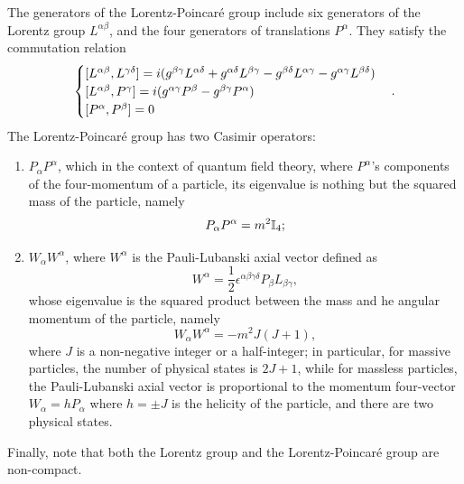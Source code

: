 The generators of the Lorentz-Poincaré group include six generators of the Lorentz group $L^{\alpha\beta}$, and the four generators of translations $P^\alpha$. They satisfy the commutation relation
\begin{equation}
    \begin{cases}
        \comm{L^{\alpha\beta}}{L^{\gamma\delta}} = i(g^{\beta\gamma}L^{\alpha\delta} + g^{\alpha\delta}L^{\beta\gamma} - g^{\beta\delta}L^{\alpha\gamma} - g^{\alpha\gamma}L^{\beta\delta}) \\
        \comm{L^{\alpha\beta}}{P^\gamma} = i(g^{\alpha\gamma}P^\beta - g^{\beta\gamma}P^\alpha) \\
        \comm{P^\alpha}{P^\beta} = 0
    \end{cases}.
\end{equation}
The Lorentz-Poincaré group has two Casimir operators:
\begin{enumerate}
    \item $P_\alpha P^\alpha$, which in the context of quantum field theory, where $P^\alpha$'s components of the four-momentum of a particle, its eigenvalue is nothing but the squared mass of the particle, namely
    \begin{equation}
        P_\alpha P^\alpha = m^2\mathbb{I}_4;
    \end{equation}
    \item $W_\alpha W^\alpha$, where $W^\alpha$ is the Pauli-Lubanski axial vector defined as
    \begin{equation}
        W^\alpha = \frac{1}{2}\epsilon^{\alpha\beta\gamma\delta}P_\beta L_{\beta\gamma},
    \end{equation}
    whose eigenvalue is the squared product between the mass and he angular momentum of the particle, namely
    \begin{equation}
        W_\alpha W^\alpha = -m^2J(J + 1),
    \end{equation}
    where $J$ is a non-negative integer or a half-integer; in particular, for massive particles, the number of physical states is $2J + 1$, while for massless particles, the Pauli-Lubanski axial vector is proportional to the momentum four-vector $W_\alpha = hP_\alpha$ where $h = \pm J$ is the helicity of the particle, and there are two physical states.
\end{enumerate}
Finally, note that both the Lorentz group and the Lorentz-Poincaré group are non-compact. 

